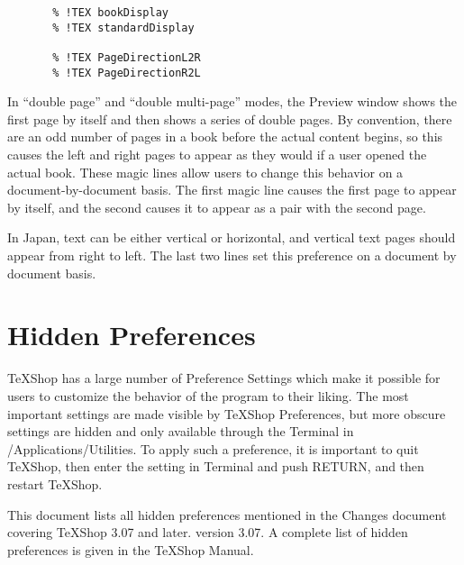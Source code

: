 \documentclass[11pt, oneside]{article}   	%
\begin{document}
\newpage
\begin{verbatim}
       % !TEX bookDisplay
       % !TEX standardDisplay
       
       % !TEX PageDirectionL2R
       % !TEX PageDirectionR2L
\end{verbatim}

In ``double page'' and ``double multi-page'' modes, the Preview window shows the first page by itself and then shows a series of double pages. By convention, there are an odd number of pages in a book before the actual content begins, so this causes the left and right pages to appear as they would if a user opened the actual book.  These magic lines allow users to change this behavior on a document-by-document basis. The first magic line causes the first page to appear by itself, and the second causes it to appear as a pair with the second page.

 In Japan, text can be either vertical or horizontal, and vertical text pages should appear from right to left.  The last two lines set this preference on a document by document basis.


 
\section{Hidden Preferences}
TeXShop has a large number of Preference Settings which make it possible for users to customize the behavior of the program to their liking. The most important settings are made visible by TeXShop Preferences, but more obscure settings are hidden and only available through the Terminal in /Applications/Utilities. To apply such a preference, it is important to quit TeXShop, then enter the setting in Terminal and push RETURN, and then restart TeXShop. 

This document lists all hidden preferences mentioned in the Changes document covering TeXShop 3.07 and later.  version 3.07. A complete list of hidden preferences is given in the TeXShop Manual.
\end{document}
